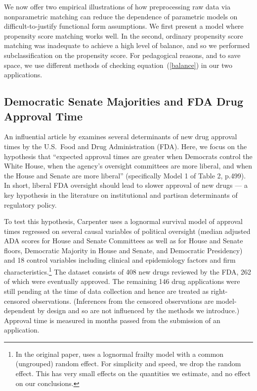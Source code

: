 \documentclass[11pt,titlepage]{article}
\begin{document}
We now offer two empirical illustrations of how preprocessing raw data
via nonparametric matching can reduce the dependence of parametric
models on difficult-to-justify functional form assumptions.  We first
present a model where propensity score matching works well.  In the
second, ordinary propensity score matching was inadequate to achieve a
high level of balance, and so we performed subclassification on the
propensity score. For pedagogical reasons, and to save space, we use
different methods of checking equation~(\ref{balance}) in our two
applications.

\subsection{Democratic Senate Majorities and FDA Drug Approval Time}

An influential article by \citet{Carp02} examines several determinants
of new drug approval times by the U.S.\ Food and Drug Administration
(FDA).  Here, we focus on the hypothesis that ``expected approval
times are greater when Democrats control the White House, when the
agency's oversight committees are more liberal, and when the House and
Senate are more liberal'' \citep[p.495]{Carp02} (specifically Model 1
of Table 2, p.499).  In short, liberal FDA oversight should lead to
slower approval of new drugs --- a key hypothesis in the literature on
institutional and partisan determinants of regulatory policy.

To test this hypothesis, Carpenter uses a lognormal survival model of
approval times regressed on several causal variables of political
oversight (median adjusted ADA scores for House and Senate Committees
as well as for House and Senate floors, Democratic Majority in House
and Senate, and Democratic Presidency) and 18 control variables
including clinical and epidemiology factors and firm
characteristics.\footnote{In the original paper, \citet{Carp02} uses a
  lognormal frailty model with a common (ungrouped) random effect.
  For simplicity and speed, we drop the random effect.  This has very
  small effects on the quantities we estimate, and no effect on our
  conclusions.}  The dataset consists of 408 new drugs reviewed by the
FDA, 262 of which were eventually approved.  The remaining 146 drug
applications were still pending at the time of data collection and
hence are treated as right-censored observations.  (Inferences from
the censored observations are model-dependent by design and so are not
influenced by the methods we introduce.)  Approval time is measured in
months passed from the submission of an application.
\end{document}
